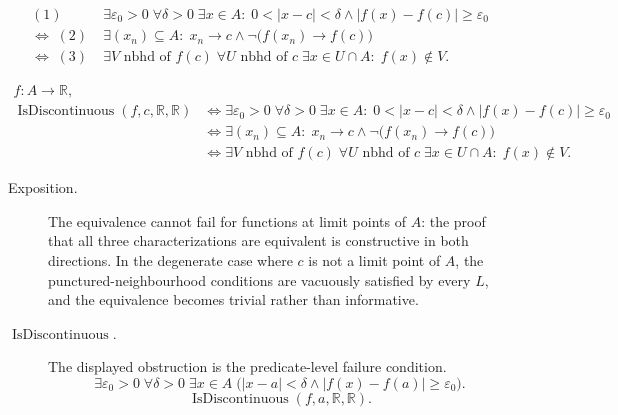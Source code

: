\begin{remark*}
\[
\begin{aligned}
(1)\; &\exists \varepsilon_0>0\;\forall \delta>0\;\exists x\in A:\;0<|x-c|<\delta \land |f(x)-f(c)|\ge \varepsilon_0\\
\Longleftrightarrow\;
(2)\; &\exists (x_n)\subseteq A:\; x_n \to c \land \neg\bigl(f(x_n)\to f(c)\bigr)\\
\Longleftrightarrow\;
(3)\; &\exists V \text{ nbhd of } f(c)\;\forall U \text{ nbhd of } c\;\exists x\in U\cap A:\;f(x)\notin V.
\end{aligned}
\]
\end{remark*}

\begin{remark*}
\[
\begin{aligned}
  f\colon A\to\mathbb{R},\\
\operatorname{IsDiscontinuous}(f,c,\mathbb{R},\mathbb{R})
&\Longleftrightarrow
\exists \varepsilon_0>0\;\forall \delta>0\;\exists x\in A:\;0<|x-c|<\delta \land |f(x)-f(c)|\ge \varepsilon_0\\
&\Longleftrightarrow
\exists (x_n)\subseteq A:\; x_n \to c \land \neg\bigl(f(x_n)\to f(c)\bigr)\\
&\Longleftrightarrow
\exists V \text{ nbhd of } f(c)\;\forall U \text{ nbhd of } c\;\exists x\in U\cap A:\;f(x)\notin V.
\end{aligned}
\]
\end{remark*}

\begin{remark*}
\begin{description}
  \item[Exposition.]
The equivalence cannot fail for functions at limit points of $A$: the proof that all three characterizations are equivalent is constructive in both directions. In the degenerate case where $c$ is not a limit point of $A$, the punctured-neighbourhood conditions are vacuously satisfied by every $L$, and the equivalence becomes trivial rather than informative.


  \item[\(\operatorname{IsDiscontinuous}.\)]
  The displayed obstruction is the predicate-level failure condition.
  \[
  \exists\varepsilon_0>0\;\forall\delta>0\;\exists x\in A\;
  \bigl(|x-a|<\delta\land |f(x)-f(a)|\ge\varepsilon_0\bigr).
  \]
  \[
  \operatorname{IsDiscontinuous}(f,a,\mathbb{R},\mathbb{R}).
  \]
\end{description}
\end{remark*}

